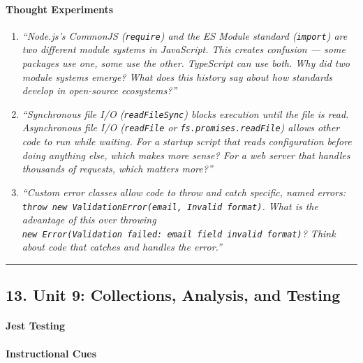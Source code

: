 \documentclass[
  justified,
  openright,
]{tufte-book}
\let\subsubsection\paragraph
\let\paragraph\paragraph
\let\subsubsection\paragraph
\let\paragraph\paragraph
\begin{document}
\paragraph{Thought Experiments}\label{thought-experiments-9}

\begin{enumerate}
\def\labelenumi{\arabic{enumi}.}
\item
  \emph{``Node.js's CommonJS (\texttt{require}) and the ES Module
  standard (\texttt{import}) are two different module systems in
  JavaScript. This creates confusion --- some packages use one, some use
  the other. TypeScript can use both. Why did two module systems emerge?
  What does this history say about how standards develop in open-source
  ecosystems?''}
\item
  \emph{``Synchronous file I/O (\texttt{readFileSync}) blocks execution
  until the file is read. Asynchronous file I/O (\texttt{readFile} or
  \texttt{fs.promises.readFile}) allows other code to run while waiting.
  For a startup script that reads configuration before doing anything
  else, which makes more sense? For a web server that handles thousands
  of requests, which matters more?''}
\item
  \emph{``Custom error classes allow code to throw and catch specific,
  named errors:
  \texttt{throw\ new\ ValidationError(\textquotesingle{}email\textquotesingle{},\ \textquotesingle{}Invalid\ format\textquotesingle{})}.
  What is the advantage of this over throwing
  \texttt{new\ Error(\textquotesingle{}Validation\ failed:\ email\ field\ invalid\ format\textquotesingle{})}?
  Think about code that catches and handles the error.''}
\end{enumerate}

\begin{center}\rule{0.5\linewidth}{0.5pt}\end{center}

\subsection{13. Unit 9: Collections, Analysis, and
Testing}\label{unit-9-collections-analysis-and-testing}

\subsubsection{Jest Testing}\label{jest-testing}

\paragraph{Instructional Cues}\label{instructional-cues-9}
\end{document}
